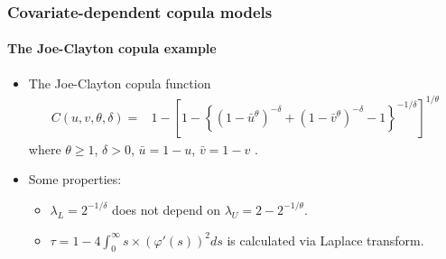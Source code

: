 \documentclass[10pt,aspectratio=169]{beamer}
\begin{document}
\begin{frame}
  \frametitle{Covariate-dependent copula models}
  \framesubtitle{The Joe-Clayton copula example}
  \begin{itemize}
  \item The Joe-Clayton copula function \citep{joe1997multivariate}
    \[
    \begin{split}
      C(u,v,\theta,\delta)=&1-\left[1-\left\{\left(1-\bar u ^{\theta }\right)^{-\delta
          }+\left(1-\bar v ^{\theta }\right)^{-\delta }-1\right\}^{-1/\delta
        }\right]^{1/\theta }
    \end{split}
    \]
    where $\theta \geq 1$, $\delta > 0$, $\bar u = 1-u$, $\bar v = 1-v$ .

  \item Some properties:
    \begin{itemize}

    \item $\lambda_L=2^{-1/\delta}$ does not depend on $\lambda_U=2-2^{-1/\theta}$.
    \item  $\tau=1- 4\int _0^{\infty} s\times(\varphi'(s))^2ds$ is calculated via Laplace transform.
    \end{itemize}
  \end{itemize}

\end{frame}
\end{document}

